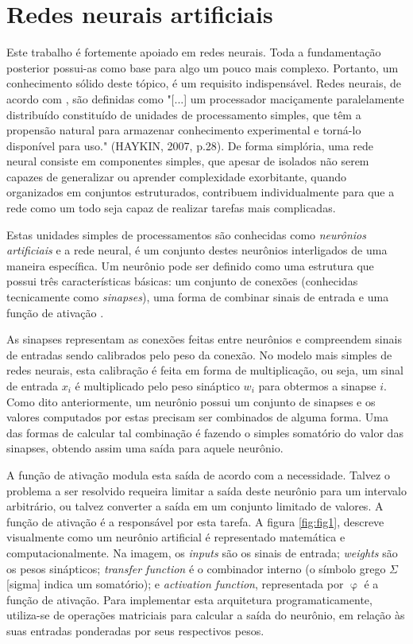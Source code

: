 \section{Redes neurais artificiais}
\label{sec:rna}

Este trabalho é fortemente apoiado em redes neurais. Toda a fundamentação posterior possui-as como base para algo um pouco mais complexo. Portanto, um conhecimento sólido deste tópico, é um requisito indispensável. Redes neurais, de acordo com , são definidas como "[...] um processador maciçamente paralelamente distribuído constituído de unidades de processamento simples, que têm a propensão natural para armazenar conhecimento experimental e torná-lo disponível para uso." (HAYKIN, 2007, p.28). De forma simplória, uma rede neural consiste em componentes simples, que apesar de isolados não serem capazes de generalizar ou aprender complexidade exorbitante, quando organizados em conjuntos estruturados, contribuem individualmente para que a rede como um todo seja capaz de realizar tarefas mais complicadas.

Estas unidades simples de processamentos são conhecidas como \textit{neurônios artificiais} e a rede neural, é um conjunto destes neurônios interligados de uma maneira específica. Um neurônio pode ser definido como uma estrutura que possui três características básicas: um conjunto de conexões (conhecidas tecnicamente como \textit{sinapses}), uma forma de combinar sinais de entrada e uma função de ativação \cite{haykin_redes_2007}. 

As sinapses representam as conexões feitas entre neurônios e compreendem sinais de entradas sendo calibrados pelo peso da conexão. No modelo mais simples de redes neurais, esta calibração é feita em forma de multiplicação, ou seja, um sinal de entrada $x_i$ é multiplicado pelo peso sináptico $w_i$ para obtermos a sinapse $i$. Como dito anteriormente, um neurônio possui um conjunto de sinapses e os valores computados por estas precisam ser combinados de alguma forma. Uma das formas de calcular tal combinação é fazendo o simples somatório do valor das sinapses, obtendo assim uma saída para aquele neurônio. 

A função de ativação modula esta saída de acordo com a necessidade. Talvez o problema a ser resolvido requeira limitar a saída deste neurônio para um intervalo arbitrário, ou talvez converter a saída em um conjunto limitado de valores. A função de ativação é a responsável por esta tarefa. A figura \ref{fig:fig1}, descreve visualmente como um neurônio artificial é representado matemática e computacionalmente. Na imagem, os \textit{inputs} são os sinais de entrada; \textit{weights} são os pesos sinápticos; \textit{transfer function} é o combinador interno (o símbolo grego $\Sigma$ [sigma] indica um somatório); e \textit{activation function}, representada por $\upvarphi$ é a função de ativação. Para implementar esta arquitetura programaticamente, utiliza-se de operações matriciais para calcular a saída do neurônio, em relação às suas entradas ponderadas por seus respectivos pesos.

